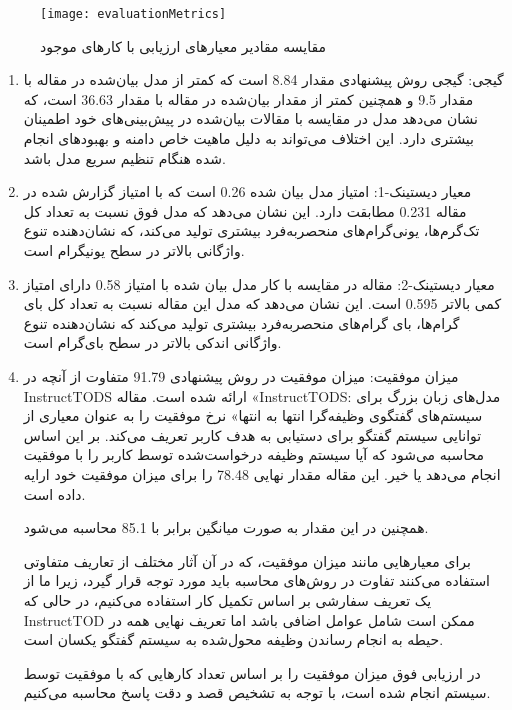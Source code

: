 \begin{figure}[ht]
    \centerline{\texttt{[image: evaluationMetrics]}}
    \caption{مقایسه مقادیر معیارهای ارزیابی با کارهای موجود}
    \label{fig:evaluationMetrics}
\end{figure}
\begin{enumerate}
\item
گیجی: گیجی  روش پیشنهادی مقدار 
 \num{8.84}
 است که کمتر از مدل بیان‌شده در مقاله %
\cite{madotto2021few}
با مقدار
\num{9.5}
 و همچنین کمتر از مقدار بیان‌شده در مقاله %
\cite{chung2023instructtods}
با مقدار 
\num{36.63}
است، که نشان می‌دهد مدل در مقایسه با مقالات بیان‌شده در پیش‌بینی‌های خود اطمینان بیشتری دارد. این اختلاف می‌تواند به دلیل ماهیت خاص دامنه و بهبودهای انجام شده هنگام تنظیم سریع مدل باشد.

\item
معیار دیستینک-1: امتیاز مدل بیان شده 
 \num{0.26}
 است که با امتیاز گزارش شده در مقاله%
\cite{kasahara2022building}
\num{0.231}
 مطابقت دارد. این نشان می‌دهد که مدل فوق نسبت به تعداد کل تک‌گرم‌ها، یونی‌گرام‌های منحصربه‌فرد بیشتری تولید می‌کند، که نشان‌دهنده تنوع واژگانی بالاتر در سطح یونیگرام است.

\item
معیار دیستینک-2: مقاله 
\cite{kasahara2022building}
در مقایسه با کار مدل بیان شده با امتیاز 
\num{0.58}
 دارای امتیاز کمی بالاتر 
\num{0.595}
است. این نشان می‌دهد که مدل این مقاله نسبت به تعداد کل بای گرام‌ها، بای گرام‌های منحصربه‌فرد بیشتری تولید می‌کند که نشان‌دهنده تنوع واژگانی اندکی بالاتر در سطح بای‌گرام است.

\item
میزان موفقیت: میزان موفقیت در  روش پیشنهادی 
\num{91.79}
 متفاوت از آنچه در InstructTODS ارائه شده است.
مقاله «InstructTODS: مدل‌های زبان بزرگ برای سیستم‌های گفتگوی وظیفه‌گرا انتها به انتها»
\cite{chung2023instructtods}
 نرخ موفقیت را به عنوان معیاری از توانایی سیستم گفتگو برای دستیابی به هدف کاربر تعریف می‌کند. بر این اساس محاسبه می‌شود که آیا سیستم وظیفه درخواست‌شده توسط کاربر را با موفقیت انجام می‌دهد یا خیر. این مقاله مقدار نهایی
\num{78.48}
را برای میزان موفقیت خود ارایه داده است.

همچنین در 
\cite{hu2024dialight}
این مقدار به صورت میانگین برابر با 
\num{85.1}
محاسبه می‌شود. 


برای معیارهایی مانند میزان موفقیت، که در آن آثار مختلف از تعاریف متفاوتی استفاده می‌کنند تفاوت در روش‌های محاسبه باید مورد توجه قرار گیرد، زیرا ما از یک تعریف سفارشی بر اساس تکمیل کار استفاده می‌کنیم، در حالی که InstructTOD ممکن است شامل عوامل اضافی باشد اما تعریف نهایی همه در حیطه به انجام ‌رساندن وظیفه محول‌شده به سیستم گفتگو یکسان است.

در ارزیابی فوق میزان موفقیت را بر اساس تعداد کارهایی که با موفقیت توسط سیستم انجام شده است، با توجه به تشخیص قصد و دقت پاسخ محاسبه می‌کنیم.

\end{enumerate}


